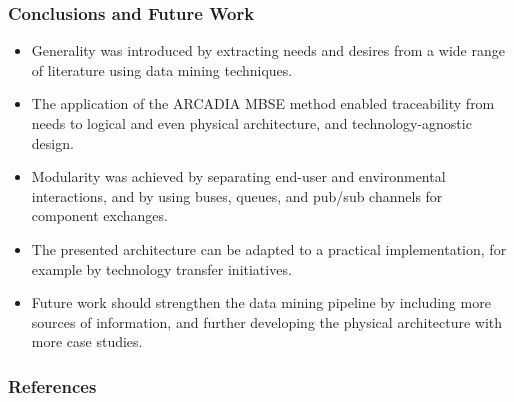 \documentclass[aspectratio=169]{beamer}
\begin{document}
\begin{frame}
    \frametitle{Conclusions and Future Work}

    \begin{itemize}
        \item Generality was introduced by extracting needs and desires from a wide range of literature using data mining techniques.
        \item The application of the ARCADIA MBSE method enabled traceability from needs to logical and even physical architecture, and technology-agnostic design.
        \item Modularity was achieved by separating end-user and environmental interactions, and by using buses, queues, and pub/sub channels for component exchanges.
        \item The presented architecture can be adapted to a practical implementation, for example by technology transfer initiatives.
        \item Future work should strengthen the data mining pipeline by including more sources of information, and further developing the physical architecture with more case studies.
    \end{itemize}
\end{frame}

\begin{frame}[allowframebreaks]
    \frametitle{References}
    
    
\end{frame}
\end{document}

